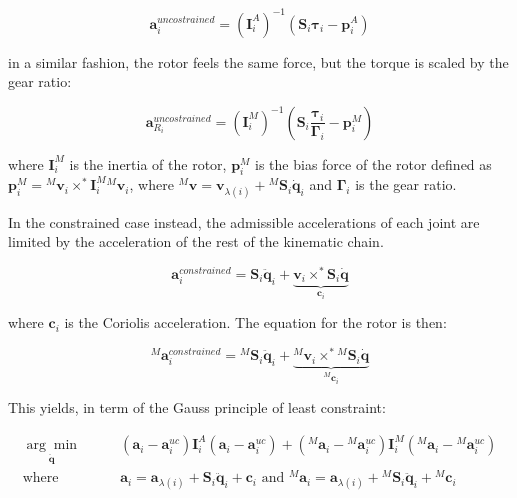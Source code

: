 \begin{equation}
    \mathbf{a} ^{uncostrained} _i = (\mathbf{I} ^A _i) ^{-1}(\mathbf{S} _i \boldsymbol{\tau} _i - \mathbf{p} ^A _i)
\end{equation}

in a similar fashion, the rotor feels the same force, but the torque is scaled by the gear ratio:

\begin{equation}
    \mathbf{a} ^{uncostrained} _{R _i} = (\mathbf{I} ^M _i) ^{-1}(\mathbf{S} _i \frac{\boldsymbol{\tau} _i}{\boldsymbol{\Gamma} _i} - \mathbf{p} ^M _i)
\end{equation}

where $\mathbf{I} ^M _i$ is the inertia of the rotor, $\mathbf{p} ^M _i$ is the bias force of the rotor defined as $\mathbf{p} ^M _i = {} ^M \mathbf{v} _i\times ^* \mathbf{I} ^M _i {} ^M \mathbf{v} _i$, where ${} ^M \mathbf{v} = \mathbf{v} _{\lambda (i)} + {} ^M \mathbf{S} _i \dot{\mathbf{q}} _i$ and $\boldsymbol{\Gamma} _i$ is the gear ratio.

In the constrained case instead, the admissible accelerations of each joint are limited by the acceleration of the rest of the kinematic chain.


\begin{equation}
    \mathbf{a} ^{constrained} _i = \mathbf{S} _i \ddot{\mathbf{q}} _i + \underbrace{\mathbf{v} _i \times ^* \mathbf{S} _i \dot{\mathbf{q}}} _{\mathbf{c} _i}
\end{equation}

where $\mathbf{c} _i$ is the Coriolis acceleration. The equation for the rotor is then:

\begin{equation}
    {} ^M \mathbf{a} ^{constrained} _i = {} ^M \mathbf{S} _i \ddot{\mathbf{q}} _i + \underbrace{{} ^M \mathbf{v} _i \times ^* {} ^M\mathbf{S} _i \dot{\mathbf{q}}} _{{} ^M \mathbf{c} _i}
\end{equation}

This yields, in term of the Gauss principle of least constraint:

\begin{align}
    \underset{\ddot{\mathbf{q}}}{\arg \min} & \qquad (\mathbf{a} _i - \mathbf{a} _i ^{uc}) \mathbf{I} ^A _i (\mathbf{a} _i - \mathbf{a} _i ^{uc}) + ({} ^M \mathbf{a} _i - {} ^M \mathbf{a} _i ^{uc}) \mathbf{I} ^M _i ({} ^M \mathbf{a} _i - {} ^M \mathbf{a} _i ^{uc}) \nonumber           \\
    \text{where }                           & \qquad \mathbf{a} _i = \mathbf{a} _{\lambda (i)} + \mathbf{S} _i \ddot{\mathbf{q}} _i + \mathbf{c} _i \text{ and } {} ^M \mathbf{a} _i = \mathbf{a} _{\lambda (i)} + {} ^M  \mathbf{S} _i \ddot{\mathbf{q}} _i + {} ^M \mathbf{c} _i \nonumber \\
\end{align}

